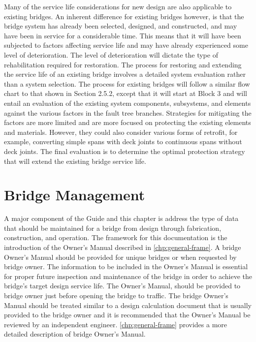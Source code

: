 Many of the service life considerations for new design are also applicable to existing bridges. An inherent
difference for existing bridges however, is that the bridge system has already been selected, designed, and
constructed, and may have been in service for a considerable time. This means that it will have been subjected to
factors affecting service life and may have already experienced some level of deterioration. The level of
deterioration will dictate the type of rehabilitation required for restoration. The process for restoring and extending
the service life of an existing bridge involves a detailed system evaluation rather than a system selection. The process
for existing bridges will follow a similar flow chart to that shown in Section 2.5.2, except that it will start at Block 3
and will entail an evaluation of the existing system components, subsystems, and elements against the various factors
in the fault tree branches. Strategies for mitigating the factors are more limited and are more focused on protecting
the existing elements and materials. However, they could also consider various forms of retrofit, for example,
converting simple spans with deck joints to continuous spans without deck joints. The final evaluation is to
determine the optimal protection strategy that will extend the existing bridge service life.

\section{Bridge Management}

A major component of the Guide and this chapter is address the type of data that should be maintained for a
bridge from design through fabrication, construction, and operation. The framework for this documentation is the
introduction of the Owner's Manual described in \cref{chp:general-frame}. A bridge Owner's Manual should be provided for unique
bridges or when requested by bridge owner. The information to be included in the Owner's Manual is essential for
proper future inspection and maintenance of the bridge in order to achieve the bridge's target design service life. The
Owner's Manual, should be provided to bridge owner just before opening the bridge to traffic. The bridge Owner's
Manual should be treated similar to a design calculation document that is usually provided to the bridge owner and it is recommended that the Owner's Manual be reviewed by an independent engineer. \cref{chp:general-frame} provides a more
detailed description of bridge Owner's Manual.

